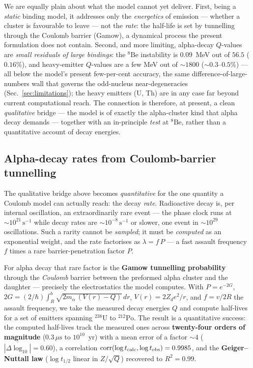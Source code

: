 \documentclass[11pt]{article}
\begin{document}
We are equally plain about what the model cannot yet deliver. First, being a \emph{static} binding
model, it addresses only the \emph{energetics} of emission --- whether a cluster is favourable to
leave --- not the \emph{rate}: the half-life is set by tunnelling through the Coulomb barrier
(Gamow), a dynamical process the present formulation does not contain. Second, and more limiting,
alpha-decay $Q$-values are \emph{small residuals of large bindings}: the $^8\mathrm{Be}$
instability is $0.09$~MeV out of $56.5$ ($0.16\%$), and heavy-emitter $Q$-values are a few MeV out
of $\sim\!1800$ ($\sim\!0.3$--$0.5\%$) --- all below the model's present few-per-cent accuracy, the
same difference-of-large-numbers wall that governs the odd-nucleus near-degeneracies
(Sec.~\ref{sec:limitations}); the heavy emitters (U, Th) are in any case far beyond current
computational reach. The connection is therefore, at present, a clean \emph{qualitative} bridge ---
the model is of exactly the alpha-cluster kind that alpha decay demands --- together with an
in-principle \emph{test} at $^8\mathrm{Be}$, rather than a quantitative account of decay energies.

\subsection{Alpha-decay rates from Coulomb-barrier tunnelling}
\label{sec:alpharates}

The qualitative bridge above becomes \emph{quantitative} for the one quantity a Coulomb model can actually
reach: the decay \emph{rate}. Radioactive decay is, per internal oscillation, an extraordinarily rare event
--- the phase clock runs at $\sim\!10^{21}\,\mathrm{s}^{-1}$ while decay rates are
$\sim\!10^{-8}\,\mathrm{s}^{-1}$ or slower, one event in $\sim\!10^{29}$ oscillations. Such a rarity cannot
be \emph{sampled}; it must be \emph{computed} as an exponential weight, and the rate factorises as
$\lambda = f\,P$ --- a fast assault frequency $f$ times a rare barrier-penetration factor $P$.

For alpha decay that rare factor is the \textbf{Gamow tunnelling probability} through the \emph{Coulomb}
barrier between the preformed alpha cluster and the daughter --- precisely the electrostatics the model
computes. With $P=e^{-2G}$, $2G=(2/\hbar)\!\int_R^b\!\sqrt{2m_\alpha\,(V(r)-Q)}\,dr$, $V(r)=2Z_d e^2/r$, and
$f=v/2R$ the assault frequency, we take the measured decay energies $Q$ and compute half-lives for a set of
emitters spanning $^{238}\mathrm{U}$ to $^{212}\mathrm{Po}$. The result is a quantitative success: the
computed half-lives track the measured ones across \textbf{twenty-four orders of magnitude}
($0.3\,\mu\mathrm{s}$ to $10^{10}$~yr) with a mean error of a factor $\sim\!4$
($\overline{|\Delta\log_{10}|}=0.60$), a correlation
$\mathrm{corr}(\log t_{\rm calc},\log t_{\rm obs})=0.9985$, and the \textbf{Geiger--Nuttall law}
($\log t_{1/2}$ linear in $Z/\sqrt{Q}$) recovered to $R^2=0.99$.
\end{document}
